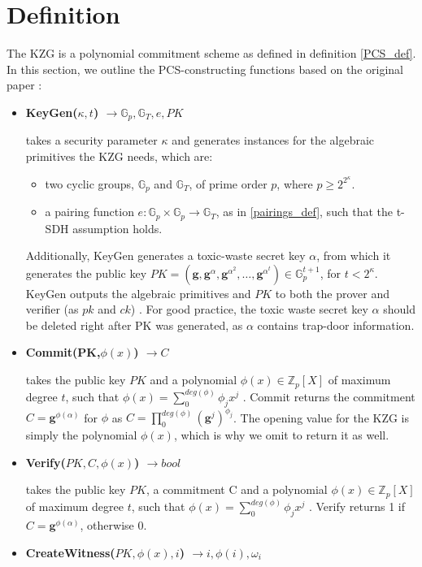 \section{Definition}
\label{Def}
The KZG is a polynomial commitment scheme as defined in definition \ref{PCS_def}. In this section, we outline the PCS-constructing functions based on the original paper \parencite{KZG}:
\begin{itemize}
    \item \textbf{KeyGen($\kappa,t$) $\rightarrow \mathbb{G}_p, \mathbb{G}_T, e, PK$} 
    
    takes a security parameter $\kappa$ and generates instances for the algebraic primitives the KZG needs, which are: 
    \begin{itemize}
        \item two cyclic groups, $\mathbb{G}_p$ and $\mathbb{G}_T$, of prime order $p$, where $p\ge2^{2^\kappa}$.
        \item a pairing function $e: \mathbb{G}_p \times \mathbb{G}_p \rightarrow \mathbb{G}_T$, as in \ref{pairings_def}, such that the t-SDH assumption holds.
    \end{itemize}
    \parencite{KZG}
    Additionally, KeyGen generates a toxic-waste secret key $\alpha$, from which it generates the public key $PK=(\mathbf{g}, \mathbf{g}^\alpha, \mathbf{g}^{\alpha^2},\dots,\mathbf{g}^{\alpha^t})\in \mathbb{G}_p^{t+1}$, for $t<2^\kappa$. KeyGen outputs the algebraic primitives and $PK$ to both the prover and verifier (as $pk$ and $ck$) \parencite{KZG}. 
    For good practice, the toxic waste secret key $\alpha$ should be deleted right after PK was generated, as $\alpha$ contains trap-door information. 
    \item \textbf{Commit(PK,$\phi(x)$) $\rightarrow C$}

    takes the public key $PK$ and a polynomial $\phi(x) \in \mathbb{Z}_p[X]$
    of maximum degree $t$, such that $\phi(x)=\sum_{0}^{deg(\phi)}\phi_jx^j$
    \parencite{KZG}. Commit returns the commitment $C=\mathbf{g}^{\phi(\alpha)}$ for $\phi$ as $C=\prod_{0}^{deg(\phi)}(\mathbf{g}^j)^{\phi_j}$\parencite{KZG}.
    The opening value for the KZG is simply the polynomial $\phi(x)$, which is why we omit to return it as well.

    \item \textbf{Verify($PK,C,\phi(x)$) $\rightarrow bool$}

    takes the public key $PK$, a commitment C and a polynomial $\phi(x) \in \mathbb{Z}_p[X]$ of maximum degree $t$, such that $\phi(x)=\sum_{0}^{deg(\phi)}\phi_jx^j$ \parencite{KZG}. Verify returns 1 if $C=\mathbf{g}^{\phi(\alpha)}$, otherwise 0.
    \item \textbf{CreateWitness($PK, \phi(x), i$) $\rightarrow i,\phi(i),\omega_i$ }


\end{itemize}
